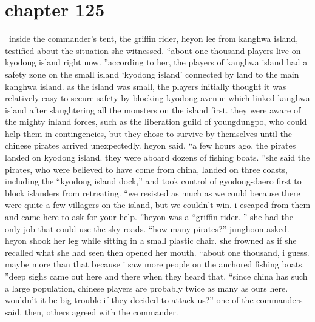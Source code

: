 \section{chapter 125}






 inside the commander’s tent, the griffin rider, heyon lee from kanghwa island, testified about the situation she witnessed.
“about one thousand players live on kyodong island right now.
”according to her, the players of kanghwa island had a safety zone on the small island ‘kyodong island’ connected by land to the main kanghwa island.
as the island was small, the players initially thought it was relatively easy to secure safety by blocking kyodong avenue which linked kanghwa island after slaughtering all the monsters on the island first.
 they were aware of the mighty inland forces, such as the liberation guild of youngdungpo, who could help them in contingencies, but they chose to survive by themselves until the chinese pirates arrived unexpectedly.
heyon said, “a few hours ago, the pirates landed on kyodong island.
 they were aboard dozens of fishing boats.
”she said the pirates, who were believed to have come from china, landed on three coasts, including the “kyodong island dock,” and took control of gyodong-daero first to block islanders from retreating.
“we resisted as much as we could because there were quite a few villagers on the island, but we couldn’t win.
 i escaped from them and came here to ask for your help.
”heyon was a “griffin rider.
” she had the only job that could use the sky roads.
“how many pirates?” junghoon asked.
heyon shook her leg while sitting in a small plastic chair.
 she frowned as if she recalled what she had seen then opened her mouth.
“about one thousand, i guess.
 maybe more than that because i saw more people on the anchored fishing boats.
”deep sighs came out here and there when they heard that.
“since china has such a large population, chinese players are probably twice as many as ours here.
 wouldn’t it be big trouble if they decided to attack us?” one of the commanders said.
 then, others agreed with the commander.

